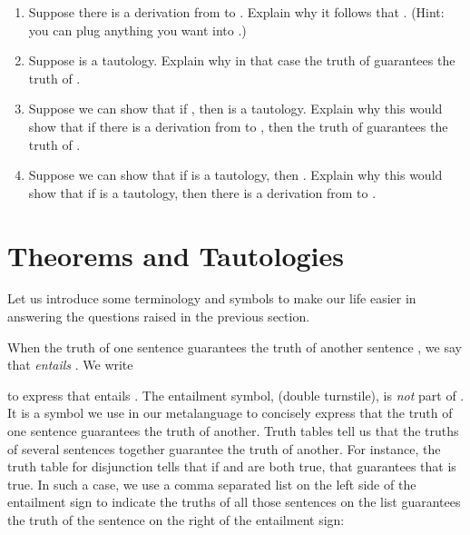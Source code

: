 \begin{enumerate}

 \item Suppose there is a derivation from  to .  Explain why it follows that . (Hint: you can 
  plug anything you want into \p{\Gamma}.)

 \item Suppose  is a tautology. Explain why in that case the truth of 
   guarantees the truth of .

  \item Suppose we can show that if , then  is 
   a tautology. Explain why this would show that if there is a derivation from 
    to , then the truth of  
   guarantees the truth of .

  \item Suppose we can show that if  is a tautology, then . Explain why this would show that if  is a 
   tautology, then there is a derivation from  to 
   .

\end{enumerate}



\section{Theorems and Tautologies}\label{sec:theoremsAndTautologies}

Let us introduce some terminology and symbols to make our life easier in 
answering the questions raised in the previous section.


 When the truth of one sentence  guarantees the truth of another sentence 
 , we say that  \emph{entails} .  We write 

\begin{center}
\end{center}

to express that  entails . The entailment symbol, \p{\lentails} 
(double turnstile), is \emph{not} part of \lL{}. It is a symbol we use in our 
metalanguage to concisely express that the truth of one sentence guarantees the 
truth of another. Truth tables tell us that the truths of several sentences 
together guarantee the truth of another. For instance, the truth table for 
disjunction tells that if  and  are both true, that 
guarantees that  is true. In such a case, we use a comma separated list on 
the left side of the entailment sign to indicate the truths of all those 
sentences on the list guarantees the truth of the sentence on the right of the 
entailment sign:


